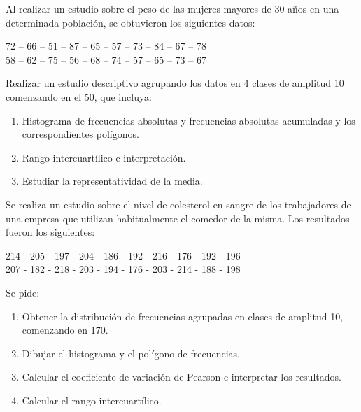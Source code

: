 {Al realizar un estudio sobre el peso de las mujeres mayores de 30 años en una determinada población, se obtuvieron los siguientes datos:
\begin{center}
72 -- 66 -- 51 -- 87 -- 65 -- 57 -- 73 -- 84 -- 67 -- 78 \\
58 -- 62 -- 75 -- 56 -- 68 -- 74 -- 57 -- 65 -- 73 -- 67
\end{center}
Realizar un estudio descriptivo agrupando los datos en 4 clases de amplitud 10 comenzando en el 50, que incluya:
\begin{enumerate}
\item Histograma de frecuencias absolutas y frecuencias absolutas acumuladas y los correspondientes polígonos.
\item Rango intercuartílico e interpretación.
\item Estudiar la representatividad de la media.
\end{enumerate}
}


{Se realiza un estudio sobre el nivel de colesterol en sangre de los trabajadores de una empresa que utilizan habitualmente el comedor de la misma. Los resultados fueron los siguientes:
\begin{center}
214 - 205 - 197 - 204 - 186 - 192 - 216 - 176 - 192 - 196\\
207 - 182 - 218 - 203 - 194 - 176 - 203 - 214 - 188 - 198
\end{center}
Se pide:

\begin{enumerate}
\item Obtener la distribución de frecuencias agrupadas en clases de amplitud 10, comenzando en 170.
\item Dibujar el histograma y el polígono de frecuencias.
\item Calcular el coeficiente de variación de Pearson e interpretar los resultados.
\item Calcular el rango intercuartílico.
\end{enumerate}
}


